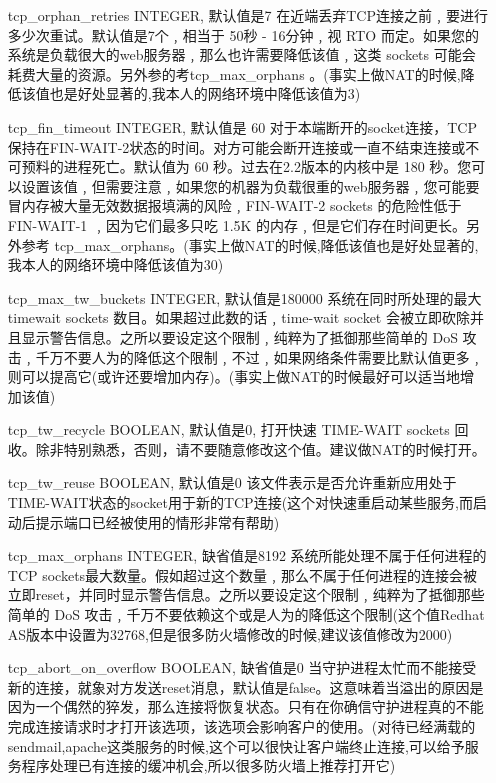 \begin{enumerate}
\item[tcp\_orphan\_retries] INTEGER,
默认值是7
在近端丢弃TCP连接之前﹐要进行多少次重试。默认值是7个﹐相当于 50秒 - 16分钟﹐视 RTO 而定。如果您的系统是负载很大的web服务器﹐那么也许需要降低该值﹐这类 sockets 可能会耗费大量的资源。另外参的考tcp\_max\_orphans 。(事实上做NAT的时候,降低该值也是好处显著的,我本人的网络环境中降低该值为3)

\item[tcp\_fin\_timeout] INTEGER,
默认值是 60
对于本端断开的socket连接，TCP保持在FIN-WAIT-2状态的时间。对方可能会断开连接或一直不结束连接或不可预料的进程死亡。默认值为 60 秒。过去在2.2版本的内核中是 180 秒。您可以设置该值﹐但需要注意﹐如果您的机器为负载很重的web服务器﹐您可能要冒内存被大量无效数据报填满的风险﹐FIN-WAIT-2 sockets 的危险性低于 FIN-WAIT-1 ﹐因为它们最多只吃 1.5K 的内存﹐但是它们存在时间更长。另外参考 tcp\_max\_orphans。(事实上做NAT的时候,降低该值也是好处显著的,我本人的网络环境中降低该值为30)

\item[tcp\_max\_tw\_buckets] INTEGER,
默认值是180000
系统在同时所处理的最大 timewait sockets 数目。如果超过此数的话﹐time-wait socket 会被立即砍除并且显示警告信息。之所以要设定这个限制﹐纯粹为了抵御那些简单的 DoS 攻击﹐千万不要人为的降低这个限制﹐不过﹐如果网络条件需要比默认值更多﹐则可以提高它(或许还要增加内存)。(事实上做NAT的时候最好可以适当地增加该值)

\item[tcp\_tw\_recycle] BOOLEAN,
                        默认值是0,
                        打开快速 TIME-WAIT sockets 回收。除非特别熟悉，否则，请不要随意修改这个值。建议做NAT的时候打开。

\item[tcp\_tw\_reuse] BOOLEAN,
默认值是0
该文件表示是否允许重新应用处于TIME-WAIT状态的socket用于新的TCP连接(这个对快速重启动某些服务,而启动后提示端口已经被使用的情形非常有帮助)

\item[tcp\_max\_orphans] INTEGER,
缺省值是8192
系统所能处理不属于任何进程的TCP sockets最大数量。假如超过这个数量﹐那么不属于任何进程的连接会被立即reset，并同时显示警告信息。之所以要设定这个限制﹐纯粹为了抵御那些简单的 DoS 攻击﹐千万不要依赖这个或是人为的降低这个限制(这个值Redhat AS版本中设置为32768,但是很多防火墙修改的时候,建议该值修改为2000)

\item[tcp\_abort\_on\_overflow] BOOLEAN,
缺省值是0
当守护进程太忙而不能接受新的连接，就象对方发送reset消息，默认值是false。这意味着当溢出的原因是因为一个偶然的猝发，那么连接将恢复状态。只有在你确信守护进程真的不能完成连接请求时才打开该选项，该选项会影响客户的使用。(对待已经满载的sendmail,apache这类服务的时候,这个可以很快让客户端终止连接,可以给予服务程序处理已有连接的缓冲机会,所以很多防火墙上推荐打开它)


\end{enumerate}
